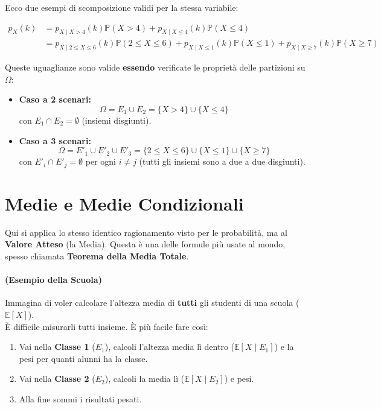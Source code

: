 Ecco due esempi di scomposizione validi per la stessa variabile:

\begin{align*}
p_X(k) &= p_{X \mid X>4}(k)\mathbb{P}(X > 4) + p_{X \mid X \le 4}(k)\mathbb{P}(X \le 4) \\[1em]
&= p_{X \mid 2 \le X \le 6}(k)\mathbb{P}(2 \le X \le 6) + p_{X \mid X \le 1}(k)\mathbb{P}(X \le 1) + p_{X \mid X \ge 7}(k)\mathbb{P}(X \ge 7)
\end{align*}

Queste uguaglianze sono valide \textbf{essendo} verificate le proprietà delle partizioni su $\Omega$:

\begin{itemize}
    \item \textbf{Caso a 2 scenari:}
    \[ \Omega = E_1 \cup E_2 = \{X > 4\} \cup \{X \le 4\} \]
    con $E_1 \cap E_2 = \emptyset$ (insiemi disgiunti).
    
    \item \textbf{Caso a 3 scenari:}
    \[ \Omega = E'_1 \cup E'_2 \cup E'_3 = \{2 \le X \le 6\} \cup \{X \le 1\} \cup \{X \ge 7\} \]
    con $E'_i \cap E'_j = \emptyset$ per ogni $i \neq j$ (tutti gli insiemi sono a due a due disgiunti).
\end{itemize}

\section{Medie e Medie Condizionali}

Qui si applica lo stesso identico ragionamento visto per le probabilità, ma al \textbf{Valore Atteso} (la Media). Questa è una delle formule più usate al mondo, spesso chiamata \textbf{Teorema della Media Totale}.

\paragraph{(Esempio della Scuola)}
Immagina di voler calcolare l'altezza media di \textbf{tutti} gli studenti di una scuola ($\mathbb{E}[X]$).
\\È difficile misurarli tutti insieme. È più facile fare così:

\begin{enumerate}
    \item Vai nella \textbf{Classe 1} ($E_1$), calcoli l'altezza media lì dentro ($\mathbb{E}[X \mid E_1]$) e la pesi per quanti alunni ha la classe.
    \item Vai nella \textbf{Classe 2} ($E_2$), calcoli la media lì ($\mathbb{E}[X \mid E_2]$) e pesi.
    \item Alla fine sommi i risultati pesati.
\end{enumerate}

